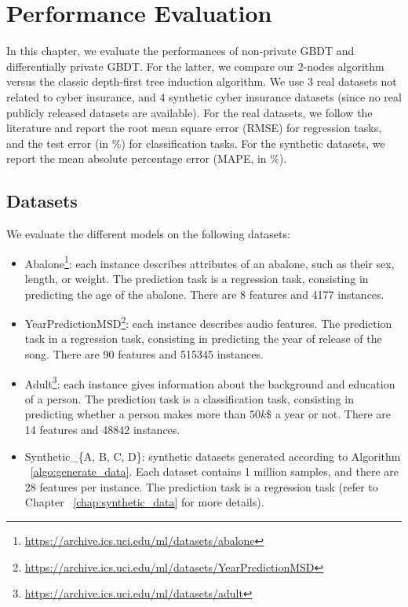 \chapter{Performance Evaluation}\label{sec:evaluation}

In this chapter, we evaluate the performances of non-private GBDT and differentially private GBDT. For the latter, we compare our 2-nodes algorithm versus the classic depth-first tree induction algorithm. We use 3 real datasets not related to cyber insurance, and 4 synthetic cyber insurance datasets (since no real publicly released datasets are available). For the real datasets, we follow the literature and report the root mean square error (RMSE) for regression tasks, and the test error (in \%) for classification tasks. For the synthetic datasets, we report the mean absolute percentage error (MAPE, in \%).

\section{Datasets}

We evaluate the different models on the following datasets:

\begin{itemize}
	\item Abalone\footnote{\href{https://archive.ics.uci.edu/ml/datasets/abalone}{https://archive.ics.uci.edu/ml/datasets/abalone}}: each instance describes attributes of an abalone, such as their sex, length, or weight. The prediction task is a regression task, consisting in predicting the age of the abalone. There are 8 features and 4177 instances.
	\item YearPredictionMSD\footnote{\href{https://archive.ics.uci.edu/ml/datasets/YearPredictionMSD}{https://archive.ics.uci.edu/ml/datasets/YearPredictionMSD}}: each instance describes audio features. The prediction task in a regression task, consisting in predicting the year of release of the song. There are 90 features and 515345 instances. 
	\item Adult\footnote{\href{https://archive.ics.uci.edu/ml/datasets/adult}{https://archive.ics.uci.edu/ml/datasets/adult}}: each instance gives information about the background and education of a person. The prediction task is a classification task, consisting in predicting whether a person makes more than $50k\$$ a year or not. There are 14 features and 48842 instances.
	\item Synthetic\_\{A, B, C, D\}: synthetic datasets generated according to Algorithm ~\ref{algo:generate_data}. Each dataset contains 1 million samples, and there are 28 features per instance. The prediction task is a regression task (refer to Chapter ~\ref{chap:synthetic_data} for more details).
\end{itemize}

